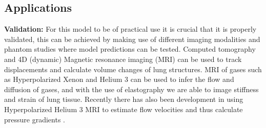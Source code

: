 




\subsection{Applications}
\noindent \textbf{Validation:} For this model to be of practical use it is crucial that it is properly validated, this can be achieved by making use of different imaging modalities and phantom studies where model predictions can be tested. Computed tomography and 4D (dynamic) Magnetic resonance imaging (MRI) can be used to track displacements and calculate volume changes of lung structures. MRI of gases such as Hyperpolarized Xenon \cite{kaushikdiffusion} and Helium 3 can be used to infer the flow and diffusion of gases, and with the use of elastography we are able to image stiffness and strain of lung tissue. Recently there has also been development in using Hyperpolarized Helium 3 MRI to estimate flow velocities and thus calculate pressure gradients \citep{patz2007hyperpolarized}.   \newline


